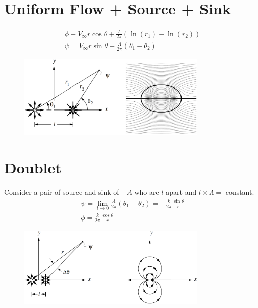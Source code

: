 \documentclass[class=report, crop=false, 12pt,a4paper]{standalone}
\begin{document}
\section{Uniform Flow + Source + Sink}
\begin{gather}
  \phi - V_{\infty} r \cos \theta + \frac{\Lambda}{2\pi}(\ln (r_1) - \ln (r_2))\\
  \psi = V_{\infty} r \sin \theta + \frac{\Lambda}{2\pi} (\theta_1 - \theta_2)
\end{gather}
\begin{figure}[H]
  \centering
  \includegraphics[width = 0.8\textwidth]{../img/diagram20.png}
\end{figure}
\section{Doublet}
Consider a pair of source and sink of $\pm \Lambda$ who are $l$ apart and $l\times\Lambda = $ constant.
\begin{gather}
  \psi =\lim_{l\rightarrow 0} \frac{\Lambda}{2\pi} (\theta_1 - \theta_2) = -\frac{k}{2\pi} \frac{\sin \theta}{r} \\
  \phi = \frac{k}{2\pi} \frac{\cos \theta}{r}
\end{gather}
\begin{figure}[H]
  \centering
  \includegraphics[width = 0.8\textwidth]{../img/diagram21.png}
\end{figure}
\end{document}
